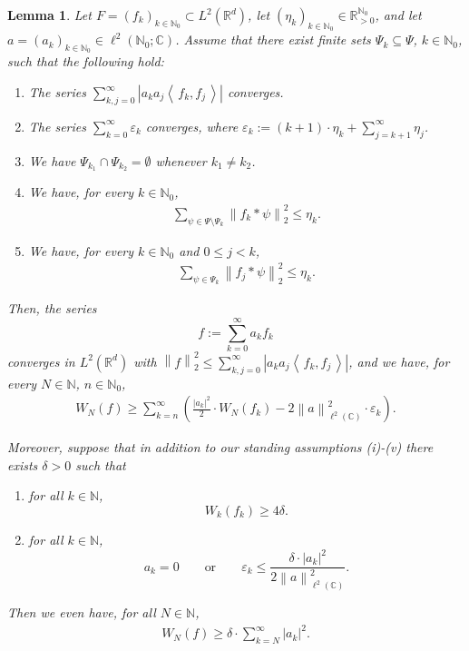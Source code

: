 \documentclass[11pt]{amsart}
\newcommand{\R}{{\mathbb{R}}}
\newcommand{\C}{{\mathbb{C}}}
\newcommand{\N}{\mathbb{N}}
\newcommand{\norm}[1]{\ensuremath{\left\lVert\text{}#1\text{}\right\rVert}}
\newcommand{\ip}[1]{\ensuremath{\left<\text{} \, #1 \, \text{}\right>}}
\newtheorem{lemma}[theorem]{Lemma}
\newenvironment{proof sketch} {\textit{Proof sketch.}}{}
\newenvironment{myenum}
{ \begin{enumerate}
    \setlength{\itemsep}{3pt}
    \setlength{\parskip}{0pt}
    \setlength{\parsep}{0pt}     }
{ \end{enumerate}                  }
\begin{document}
  \begin{lemma}\label{lem: approx additivity}
    Let $F=(f_k)_{k\in \N_0} \subset L^2(\R^d)$, let $(\eta_k)_{k \in \N_0} \in \R_{>0}^{\N_0}$, and let $a=(a_k)_{k \in \N_0}\in \ell^2(\N_0;\C)$. Assume that there exist finite sets $\Psi_k\subseteq \Psi$, $k \in \N_0$, such that the following hold:
    \begin{myenum}
      \item[(i)] The series $\sum_{k,j=0}^\infty\left|a_ka_j \ip{f_k,f_j}\right|$ converges.
      \item[(ii)] The series $\sum_{k=0}^\infty \varepsilon_k$ converges, where $\varepsilon_k:=(k+1) \cdot \eta_k+\sum_{j=k+1}^\infty \eta_j$.
      \item[(iii)] We have $\Psi_{k_1}\cap \Psi_{k_2}=\emptyset$ whenever $k_1\neq k_2$. 
      \item[(iv)] We have, for every $k \in \N_0$,
      \begin{align*}
        \sum_{\psi \in \Psi\setminus\Psi_k} \norm{f_k*\psi}_2^2 \leq \eta_k.
      \end{align*}  
      \item[(v)] We have, for every $k \in \N_0$ and $0\leq j < k$,
      \begin{align*}
        \sum_{\psi \in \Psi_k} \norm{f_j*\psi}_2^2 \leq \eta_k.
      \end{align*}
    \end{myenum}
  
    Then, the series 
    \[f:=\sum_{k=0}^\infty a_k f_k\] 
    converges in $L^2(\R^d)$ with $\norm{f}_2^2\leq \sum_{k,j=0}^\infty\left|a_ka_j \ip{f_k,f_j}\right|$, and we have, for every $N \in \N$, $n \in \N_0$, 
    \begin{align}\label{inequ: lower bound for W_N(f) (technical)}
      W_N\left(f\right)\geq \sum_{k=n}^\infty \left(\frac{|a_k|^2}{2} \cdot W_{N}(f_k) - 2 \norm{a}_{\ell^2(\C)}^2 \cdot \varepsilon_k\right).
    \end{align}
  
    Moreover, suppose that in addition to our standing assumptions (i)-(v) there exists $\delta>0$ such that
    \begin{myenum}
      \item[(vi)] for all $k \in \N$, \[W_k(f_k)\geq 4\delta.\]
      \item[(vii)] for all $k \in \N$, \[a_k=0 \qquad \text{or} \qquad \varepsilon_k\leq \frac{\delta \cdot |a_k|^2}{2\norm{a}_{\ell^2(\C)}^2}.\]
    \end{myenum}
    Then we even have, for all $N \in \N$,
    \begin{align}\label{inequ: lower bound for W_N(f) (simplified)}
      W_N(f)\geq \delta \cdot \sum_{k=N}^\infty |a_k|^2.
    \end{align}
  \end{lemma}
  
\end{document}
